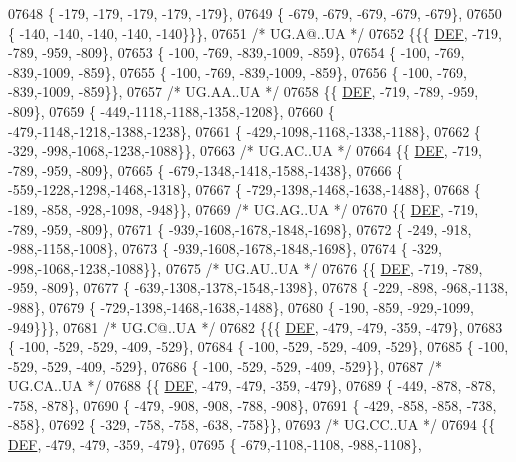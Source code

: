 \begin{DoxyCode}
07648 \{ -179, -179, -179, -179, -179\},
07649 \{ -679, -679, -679, -679, -679\},
07650 \{ -140, -140, -140, -140, -140\}\}\},
07651 \textcolor{comment}{/* UG.A@..UA */}
07652 \{\{\{  \mbox{\hyperlink{1_88_84__epars_8h_a397419fc12b37ed479c8abb9d444d843}{DEF}}, -719, -789, -959, -809\},
07653 \{ -100, -769, -839,-1009, -859\},
07654 \{ -100, -769, -839,-1009, -859\},
07655 \{ -100, -769, -839,-1009, -859\},
07656 \{ -100, -769, -839,-1009, -859\}\},
07657 \textcolor{comment}{/* UG.AA..UA */}
07658 \{\{  \mbox{\hyperlink{1_88_84__epars_8h_a397419fc12b37ed479c8abb9d444d843}{DEF}}, -719, -789, -959, -809\},
07659 \{ -449,-1118,-1188,-1358,-1208\},
07660 \{ -479,-1148,-1218,-1388,-1238\},
07661 \{ -429,-1098,-1168,-1338,-1188\},
07662 \{ -329, -998,-1068,-1238,-1088\}\},
07663 \textcolor{comment}{/* UG.AC..UA */}
07664 \{\{  \mbox{\hyperlink{1_88_84__epars_8h_a397419fc12b37ed479c8abb9d444d843}{DEF}}, -719, -789, -959, -809\},
07665 \{ -679,-1348,-1418,-1588,-1438\},
07666 \{ -559,-1228,-1298,-1468,-1318\},
07667 \{ -729,-1398,-1468,-1638,-1488\},
07668 \{ -189, -858, -928,-1098, -948\}\},
07669 \textcolor{comment}{/* UG.AG..UA */}
07670 \{\{  \mbox{\hyperlink{1_88_84__epars_8h_a397419fc12b37ed479c8abb9d444d843}{DEF}}, -719, -789, -959, -809\},
07671 \{ -939,-1608,-1678,-1848,-1698\},
07672 \{ -249, -918, -988,-1158,-1008\},
07673 \{ -939,-1608,-1678,-1848,-1698\},
07674 \{ -329, -998,-1068,-1238,-1088\}\},
07675 \textcolor{comment}{/* UG.AU..UA */}
07676 \{\{  \mbox{\hyperlink{1_88_84__epars_8h_a397419fc12b37ed479c8abb9d444d843}{DEF}}, -719, -789, -959, -809\},
07677 \{ -639,-1308,-1378,-1548,-1398\},
07678 \{ -229, -898, -968,-1138, -988\},
07679 \{ -729,-1398,-1468,-1638,-1488\},
07680 \{ -190, -859, -929,-1099, -949\}\}\},
07681 \textcolor{comment}{/* UG.C@..UA */}
07682 \{\{\{  \mbox{\hyperlink{1_88_84__epars_8h_a397419fc12b37ed479c8abb9d444d843}{DEF}}, -479, -479, -359, -479\},
07683 \{ -100, -529, -529, -409, -529\},
07684 \{ -100, -529, -529, -409, -529\},
07685 \{ -100, -529, -529, -409, -529\},
07686 \{ -100, -529, -529, -409, -529\}\},
07687 \textcolor{comment}{/* UG.CA..UA */}
07688 \{\{  \mbox{\hyperlink{1_88_84__epars_8h_a397419fc12b37ed479c8abb9d444d843}{DEF}}, -479, -479, -359, -479\},
07689 \{ -449, -878, -878, -758, -878\},
07690 \{ -479, -908, -908, -788, -908\},
07691 \{ -429, -858, -858, -738, -858\},
07692 \{ -329, -758, -758, -638, -758\}\},
07693 \textcolor{comment}{/* UG.CC..UA */}
07694 \{\{  \mbox{\hyperlink{1_88_84__epars_8h_a397419fc12b37ed479c8abb9d444d843}{DEF}}, -479, -479, -359, -479\},
07695 \{ -679,-1108,-1108, -988,-1108\},

\end{DoxyCode}
